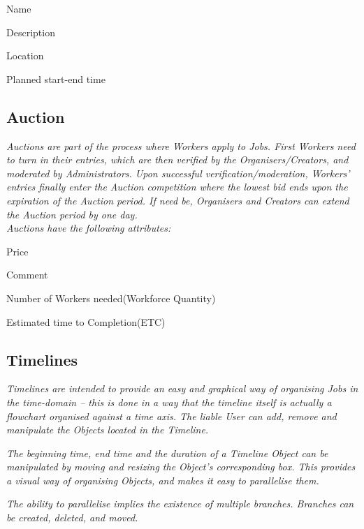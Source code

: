 		\begin{packed_enum}
			\item Name
			\item Description
			\item Location
			\item Planned start-end time
		\end{packed_enum}
		
		\subsection{Auction}
		\textit{Auctions are part of the process where Workers apply to Jobs. First Workers need to turn in their entries, which are then verified by the Organisers/Creators, and moderated by Administrators. Upon successful verification/moderation, Workers' entries finally enter the Auction
		competition where the lowest bid ends upon the expiration of the Auction period. If need be, Organisers and Creators can extend the Auction period by one day.}\\
	
		\textit{Auctions have the following attributes:}
		\begin{packed_enum}
			\item Price
			\item Comment
			\item Number of Workers needed(Workforce Quantity)
			\item Estimated time to Completion(ETC)
		\end{packed_enum}
	
		\subsection{Timelines}
		\textit{Timelines are intended to provide an easy and graphical way of organising Jobs in the time-domain – this is done in a way that the timeline itself is actually a flowchart organised against a time axis. The liable User can add, remove and manipulate the Objects located in the Timeline.}
		
		\textit{The beginning time, end time and the duration of a Timeline Object can be manipulated by moving and resizing the Object’s corresponding box. This provides a visual way of organising Objects, and makes it easy to parallelise them.}
		
		\textit{The ability to parallelise implies the existence of multiple branches. Branches can be created, deleted, and moved.}
	
